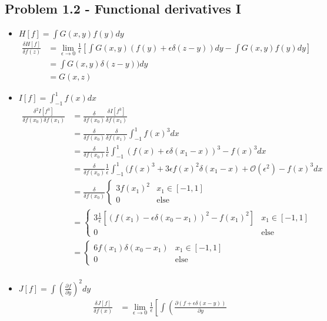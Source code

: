 \documentclass[10pt,a4paper]{book}
\theoremstyle{definition}
\begin{document}
\subsection{Problem 1.2 - Functional derivatives I}
\begin{itemize}
\item $H[f]=\int G(x,y)f(y)dy$ 
\begin{align}
\frac{\delta H[f]}{\delta f(z)}
&=\lim_{\epsilon\rightarrow0}\frac{1}{\epsilon}\left[\int G(x,y)(f(y)+\epsilon\delta(z-y))dy-\int G(x,y)f(y)dy\right]\\
&=\int G(x,y)\delta(z-y))dy\\
&=G(x,z)
\end{align}
\item $I[f]=\int_{-1}^1f(x)dx$
\begin{align}
\frac{\delta^2I[f^3]}{\delta f(x_0)\delta f(x_1)}
&=\frac{\delta}{\delta f(x_0)}\frac{\delta I[f^3]}{\delta f(x_1)}\\
&=\frac{\delta}{\delta f(x_0)}\frac{\delta}{\delta f(x_1)}\int_{-1}^1f(x)^3dx\\
&=\frac{\delta}{\delta f(x_0)}\frac{1}{\epsilon}\int_{-1}^1(f(x)+\epsilon\delta(x_1-x))^3-f(x)^3dx\\
&=\frac{\delta}{\delta f(x_0)}\frac{1}{\epsilon}\int_{-1}^1(f(x)^3+3\epsilon f(x)^2\delta(x_1-x)+\mathcal{O}(\epsilon^2)-f(x)^3dx\\
&=\frac{\delta}{\delta f(x_0)}
\left\{
\begin{matrix}
 3f(x_1)^2 & x_1\in[-1,1]\\
 0         & \text{else}
\end{matrix}
\right.\\
&=
\left\{
\begin{matrix}
 3\frac{1}{\epsilon}[(f(x_1)-\epsilon\delta(x_0-x_1))^2-f(x_1)^2] & x_1\in[-1,1]\\
 0         & \text{else}
\end{matrix}
\right.\\
&=
\left\{
\begin{matrix}
 6f(x_1)\delta(x_0-x_1) & x_1\in[-1,1]\\
 0         & \text{else}
\end{matrix}
\right.\\
\end{align}
\item $J[f]=\int\left(\frac{\partial f}{\partial y}
\right)^2dy$
\begin{align}
\frac{\delta J[f]}{\delta f(x)}
&=\lim_{\epsilon\rightarrow0}\frac{1}{\epsilon}\left[\int\left(\frac{\partial (f+\epsilon\delta(x-y))}{\partial y}

\end{align}
\end{itemize}
\end{document}
